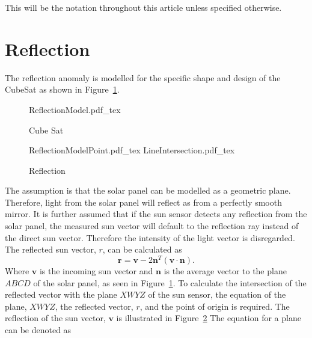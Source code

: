 \documentclass[letterpaper, 10 pt, conference]{ieeeconf}  %
\begin{document}
This will be the notation throughout this article unless specified otherwise. 

\section{Reflection}
\label{section:Reflection}
The reflection anomaly is modelled for the specific shape and design of the CubeSat as shown in Figure~\ref{fig:CubeSat}.

\begin{figure}[!htb]
	\centering
	\def\svgwidth{7cm}
	{ReflectionModel.pdf_tex}
	\caption{Cube Sat}
	\label{fig:CubeSat}
\end{figure}

\begin{figure}[!hbt]
	\centering
	\def\svgwidth{7cm}
	{ReflectionModelPoint.pdf_tex}
	\centering
	\def\svgwidth{7cm}
	{LineIntersection.pdf_tex}
	\caption{Reflection}
	\label{fig:LineIntersection}
\end{figure}

The assumption is that the solar panel can be modelled as a geometric plane. Therefore, light from the solar panel will reflect as from a perfectly smooth mirror. It is further assumed that if the sun sensor detects any reflection from the solar panel, the measured sun vector will default to the reflection ray instead of the direct sun vector. Therefore the intensity of the light vector is disregarded. The reflected sun vector, $r$, can be calculated as
\begin{equation}
\mathbf{r} = \mathbf{v} - 2\mathbf{n}^T(\mathbf{v} \cdot \mathbf{n}).
\end{equation}
Where $\mathbf{v}$ is the incoming sun vector and $\mathbf{n}$ is the average vector to the plane $ABCD$ of the solar panel, as seen in Figure~\ref{fig:CubeSat}. To calculate the intersection of the reflected vector with the plane $XWYZ$ of the sun sensor, the equation of the plane, $XWYZ$, the reflected vector, $r$, and the point of origin is required. The reflection of the sun vector, $\mathbf{v}$ is illustrated in Figure~\ref{fig:LineIntersection} The equation for a plane can be denoted as
\end{document}
